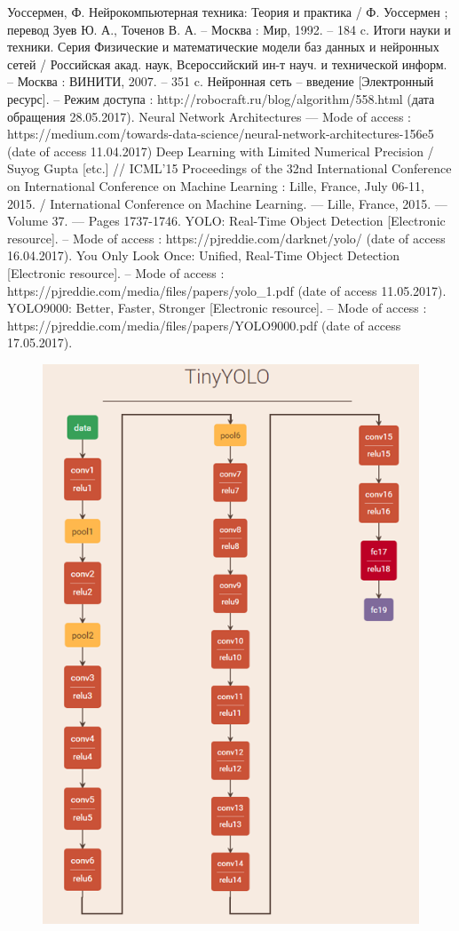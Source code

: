 \documentclass[a4paper,english,russian]{G2-105}
\begin{document}
\begin{thebibliography}{1}
     Уоссермен, Ф. Нейрокомпьютерная техника: Теория и практика / Ф. Уоссермен ; перевод Зуев Ю. А., Точенов В. А. – Москва : Мир, 1992. – 184 c.
     Итоги науки и техники. Серия Физические и математические модели баз данных и нейронных сетей / Российская акад. наук, Всероссийский ин-т науч. и технической информ. – Москва : ВИНИТИ, 2007. – 351 c.
	 Нейронная сеть – введение [Электронный ресурс]. – Режим доступа : http://robocraft.ru/blog/algorithm/558.html (дата обращения
28.05.2017).
     Neural Network Architectures — Mode of access :
https://medium.com/towards-data-science/neural-network-architectures-156e5
(date of access 11.04.2017)
     Deep Learning with Limited Numerical Precision / Suyog Gupta
[etc.] // ICML’15 Proceedings of the 32nd International Conference on
International Conference on Machine Learning : Lille, France, July 06-11,
2015. / International Conference on Machine Learning. — Lille, France, 2015. —  Volume 37. — Pages 1737-1746.
     YOLO: Real-Time Object Detection [Electronic resource]. – Mode
of access : https://pjreddie.com/darknet/yolo/ (date of access 16.04.2017).
     You Only Look Once: Unified, Real-Time Object Detection [Electronic resource]. – Mode of access : https://pjreddie.com/media/files/papers/yolo\_1.pdf (date of access 11.05.2017).
     YOLO9000: Better, Faster, Stronger [Electronic resource]. – Mode of access : https://pjreddie.com/media/files/papers/YOLO9000.pdf (date of access 17.05.2017). 
\end{thebibliography}
\begin{figure}
\begin{center}
    \includegraphics[width=0.75\linewidth]{tinyyoloar.png}
\end{center}
\end{figure}
\end{document}
